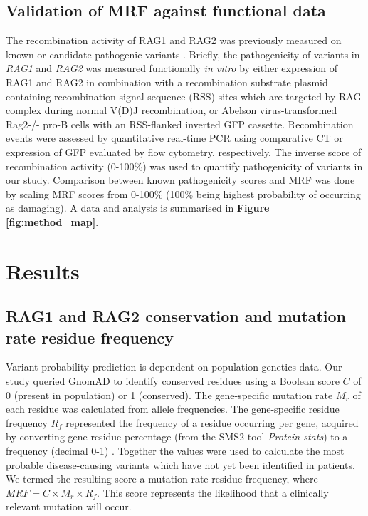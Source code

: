 \documentclass[preprint,11pt,fleqn]{elsarticle}
\begin{document}
\subsection*{\textbf{Validation of MRF against functional data}}
\noindent The recombination activity of RAG1 and RAG2 was previously measured on known or candidate pathogenic variants \citep{lee2014systematic, lawless2018prevalence, tirosh2018recombination}. 
Briefly, the pathogenicity of variants in \textit{RAG1} and \textit{RAG2} was measured functionally \textit{in vitro} by either expression of RAG1 and RAG2 in combination with a recombination substrate plasmid containing recombination signal sequence (RSS) sites which are targeted by RAG complex during normal V(D)J recombination, or  Abelson virus-transformed Rag2-/- pro-B cells with an RSS-flanked inverted GFP cassette.  
Recombination events were assessed by quantitative real-time PCR using comparative CT or expression of GFP evaluated by flow cytometry, respectively.
The inverse score of recombination activity (0-100\%) was used to quantify pathogenicity of variants in our study. 
Comparison between known pathogenicity scores and MRF was done by scaling MRF scores from 0-100\% (100\% being highest probability of occurring as damaging). 
A data and analysis is summarised in \textbf{Figure 
\ref{fig:method_map}}.


\section*{Results}
\subsection*{\textbf{RAG1 and RAG2 conservation and mutation rate residue frequency}}
\noindent Variant probability prediction is dependent on population genetics data.
Our study queried GnomAD 
\citep{lek2016analysis}
to identify conserved residues using a Boolean score $C$ of 0 (present in population) or 1 (conserved). 
The gene-specific mutation rate ${M}_{r}$ of each residue was calculated from allele frequencies. 
The gene-specific residue frequency ${R}_{f}$ represented the frequency of a residue occurring per gene, acquired by converting gene residue percentage (from the SMS2 tool \textit{Protein stats}) to a frequency (decimal 0-1)
\citep{stothard2000sequence}.
Together the values were used to calculate the most probable disease-causing variants which have not yet been identified in patients. 
We termed the resulting score a mutation rate residue frequency, where $MRF = {C} \times {M}_{r} \times {R}_f$. 
This score represents the likelihood that a clinically relevant mutation will occur. 
\end{document}
